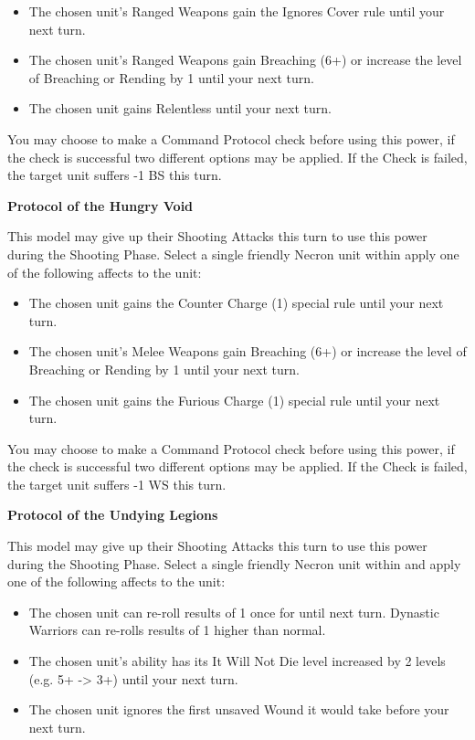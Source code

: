 \begin{multicols}{2}
\begin{itemize}
	\itemsep 0pt
	\item The chosen unit's Ranged Weapons gain the Ignores Cover rule until your next turn.
	\item The chosen unit's Ranged Weapons gain Breaching (6+) or increase the level of Breaching or Rending by 1 until your next turn.
	\item The chosen unit gains Relentless until your next turn.
\end{itemize}

You may choose to make a Command Protocol check before using this power, if the check is successful two different options may be applied. If the Check is failed, the target unit suffers -1 BS this turn.

\textbf{Protocol of the Hungry Void}

This model may give up their Shooting Attacks this turn to use this power during the Shooting Phase. Select a single friendly Necron unit within  apply one of the following affects to the unit:

\begin{itemize}
	\itemsep 0pt
	\item The chosen unit gains the Counter Charge (1) special rule until your next turn.
	\item The chosen unit's Melee Weapons gain Breaching (6+) or increase the level of Breaching or Rending by 1 until your next turn.
	\item The chosen unit gains the Furious Charge (1) special rule until your next turn.
\end{itemize}

You may choose to make a Command Protocol check before using this power, if the check is successful two different options may be applied. If the Check is failed, the target unit suffers -1 WS this turn.

\textbf{Protocol of the Undying Legions}

This model may give up their Shooting Attacks this turn to use this power during the Shooting Phase. Select a single friendly Necron unit within  and apply one of the following affects to the unit:

\begin{itemize}
	\itemsep 0pt
	\item The chosen unit can re-roll results of 1 once for  until next turn. Dynastic Warriors can re-rolls results of 1 higher than normal.
	\item The chosen unit's  ability has its It Will Not Die level increased by 2 levels (e.g. 5+ -> 3+) until  your next turn.
	\item The chosen unit ignores the first unsaved Wound it would take before your next turn.
\end{itemize}


\end{multicols}
